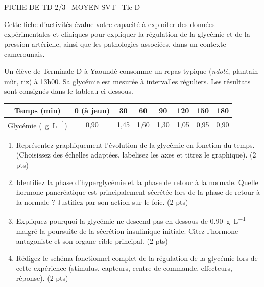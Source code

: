 \documentclass[11pt]{article}
\begin{document}
\begin{tcolorbox}[enhanced,colback=popink,colframe=popink,arc=10pt,boxrule=0pt,left=12pt,right=12pt,top=9pt,bottom=9pt]
{\color{white}\popxbold\small FICHE DE TD 2/3 \textbullet\ MOYEN \hfill SVT \textbullet\ Tle D\par}
\end{tcolorbox}
\vspace{4pt}
\noindent Cette fiche d'activités évalue votre capacité à exploiter des données expérimentales et cliniques pour expliquer la régulation de la glycémie et de la pression artérielle, ainsi que les pathologies associées, dans un contexte camerounais.

\begin{exercice}
Un élève de Terminale D à Yaoundé consomme un repas typique (\textit{ndolé}, plantain mûr, riz) à 13h00. Sa glycémie est mesurée à intervalles réguliers. Les résultats sont consignés dans le tableau ci-dessous.

\begin{center}
\begin{tabular}{|c|c|c|c|c|c|c|c|}
\hline
Temps (min) & 0 (à jeun) & 30 & 60 & 90 & 120 & 150 & 180 \\
\hline
Glycémie (\SI{}{g.L^{-1}}) & 0,90 & 1,45 & 1,60 & 1,30 & 1,05 & 0,95 & 0,90 \\
\hline
\end{tabular}
\end{center}

\begin{enumerate}
    \item Représentez graphiquement l'évolution de la glycémie en fonction du temps. (Choisissez des échelles adaptées, labelisez les axes et titrez le graphique). \hfill (2 pts)
    \item Identifiez la phase d'hyperglycémie et la phase de retour à la normale. Quelle hormone pancréatique est principalement sécrétée lors de la phase de retour à la normale ? Justifiez par son action sur le foie. \hfill (2 pts)
    \item Expliquez pourquoi la glycémie ne descend pas en dessous de \SI{0,90}{g.L^{-1}} malgré la poursuite de la sécrétion insulinique initiale. Citez l'hormone antagoniste et son organe cible principal. \hfill (2 pts)
    \item Rédigez le schéma fonctionnel complet de la régulation de la glycémie lors de cette expérience (stimulus, capteurs, centre de commande, effecteurs, réponse). \hfill (2 pts)
\end{enumerate}
\end{exercice}
\end{document}

